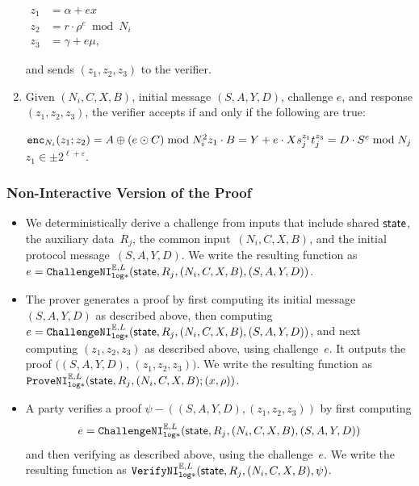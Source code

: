 \documentclass[11pt]{article}
\def\state{{\sf state}}
\newcommand{\enc}{\ensuremath{\mathtt{enc}}}
\newcommand{\sid}{\ensuremath{\mathtt{sid}}}
\newcommand{\challengeni}[1]{\ensuremath{\mathtt{ChallengeNI}_{\mathtt{#1}}}}
\newcommand{\proveni}[1]{\ensuremath{\mathtt{ProveNI}_{\mathtt{#1}}}}
\newcommand{\verifyni}[1]{\ensuremath{\mathtt{VerifyNI}_{\mathtt{#1}}}}
\newcommand{\E}{\mathbb{E}}
\newcommand{\?}[1]{\stackrel{?}{#1}}
\begin{document}
\begin{enumerate}
    $\begin{aligned}
        z_1 &= \alpha + e x \\
        z_2 &= r \cdot \rho^e \bmod N_i \\
        z_3 &= \gamma + e \mu,
    \end{aligned}$
    
and sends $(z_1, z_2, z_3)$ to the verifier.

    \item Given $(N_i,C,X,B)$, initial message $(S,A,Y,D)$, challenge $e$, and response $(z_1,z_2,z_3)$, the verifier accepts if and only if the following are true:

    $\enc_{N_i}(z_1; z_2)  = A \oplus (e \odot C) \bmod N_i^2\\
    z_1 \cdot B = Y + e \cdot X \\
    s_j^{z_1} t_j^{z_3} = D \cdot S^e \bmod N_j$  \\
    $z_1 \in \pm 2^{\ell + \varepsilon}$.
\end{enumerate}

\subsubsection{Non-Interactive Version of the Proof}

\begin{itemize}
    \item We deterministically derive a challenge from inputs that include shared $\state$, the auxiliary data~$R_j$, the common input~$(N_i,C,X, B)$, and the initial protocol message~$(S,A,Y,D)$.   
    We write the resulting function as 
    $e=\challengeni{log*}^{\E,L}(\state, R_j, (N_i,C,X, B), (S,A,Y,D))$.


    \item The prover generates a proof by first computing its initial message $(S, A, Y, D)$ as described above, then computing $e = \challengeni{log*}^{\E,L}(\state, R_j,(N_i,C,X, B), (S,A,Y,D))$, and next computing $(z_1,z_2,z_3)$ as described above, using challenge~$e$. It outputs the proof $((S, A, Y, D)$, $(z_1, z_2, z_3))$. We write the resulting function as $\proveni{log*}^{\E,L}(\state,R_j, (N_i, C, X, B); (x,\rho))$.

    \item A party verifies a proof $\psi-((S, A, Y, D), (z_1, z_2, z_3))$ by first computing \[e = \challengeni{log*}^{\E,L}(\state, R_j, (N_i,C,X, B), (S,A,Y,D))\] and then verifying as described above, using the challenge~$e$. We write the resulting function as $\verifyni{log*}^{\E,L}(\state, R_j, (N_i, C, X, B), \psi)$.
\end{itemize}
\end{document}
